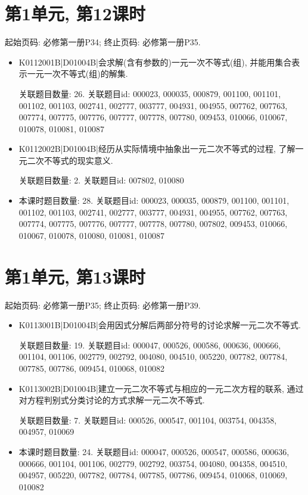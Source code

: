 \section*{第1单元, 第12课时}
起始页码: 必修第一册P34; 终止页码: 必修第一册P35.
\begin{itemize}
\item K0112001B|D01004B|会求解(含有参数的)一元一次不等式(组), 并能用集合表示一元一次不等式(组)的解集.

关联题目数量: 26. 关联题目id: 000023, 000035, 000879, 001100, 001101, 001102, 001103, 002741, 002777, 003777, 004931, 004955, 007762, 007763, 007774, 007775, 007776, 007777, 007778, 007780, 009453, 010066, 010067, 010078, 010081, 010087

\item K0112002B|D01004B|经历从实际情境中抽象出一元二次不等式的过程, 了解一元二次不等式的现实意义.

关联题目数量: 2. 关联题目id: 007802, 010080

\item 本课时题目数量: 28. 关联题目id: 000023, 000035, 000879, 001100, 001101, 001102, 001103, 002741, 002777, 003777, 004931, 004955, 007762, 007763, 007774, 007775, 007776, 007777, 007778, 007780, 007802, 009453, 010066, 010067, 010078, 010080, 010081, 010087

\end{itemize}

\section*{第1单元, 第13课时}
起始页码: 必修第一册P35; 终止页码: 必修第一册P39.
\begin{itemize}
\item K0113001B|D01004B|会用因式分解后两部分符号的讨论求解一元二次不等式.

关联题目数量: 19. 关联题目id: 000047, 000526, 000586, 000636, 000666, 001104, 001106, 002779, 002792, 004080, 004510, 005220, 007782, 007784, 007785, 007786, 009454, 010068, 010082

\item K0113002B|D01004B|建立一元二次不等式与相应的一元二次方程的联系, 通过对方程判别式分类讨论的方式求解一元二次不等式.

关联题目数量: 7. 关联题目id: 000526, 000547, 001104, 003754, 004358, 004957, 010069

\item 本课时题目数量: 24. 关联题目id: 000047, 000526, 000547, 000586, 000636, 000666, 001104, 001106, 002779, 002792, 003754, 004080, 004358, 004510, 004957, 005220, 007782, 007784, 007785, 007786, 009454, 010068, 010069, 010082

\end{itemize}

